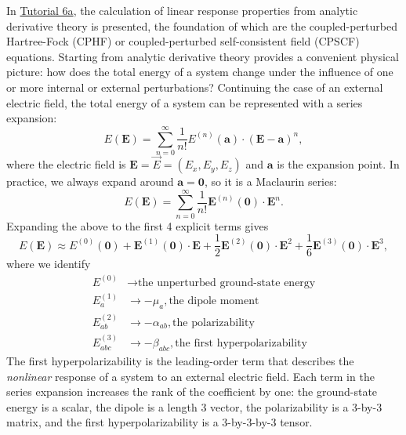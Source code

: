 In \href{https://github.com/psi4/psi4numpy/blob/066f378f26240a4802371ef32849230853581329/Tutorials/06_Molecular_Properties/6a_CP-SCF.ipynb}{Tutorial 6a}, the calculation of linear response properties from analytic derivative theory is presented, the foundation of which are the coupled-perturbed Hartree-Fock (CPHF) or coupled-perturbed self-consistent field (CPSCF) equations. Starting from analytic derivative theory provides a convenient physical picture: how does the total energy of a system change under the influence of one or more internal or external perturbations? Continuing the case of an external electric field, the total energy of a system can be represented with a series expansion:
\begin{equation}
  E(\mathbf{E}) = \sum_{n=0}^{\infty} \frac{1}{n!}E^{(n)}(\mathbf{a})\cdot(\mathbf{E}-\mathbf{a})^{n},
\end{equation}
where the electric field is \(\mathbf{E} = \vec{E} = (E_x,E_y,E_z)\) and \(\mathbf{a}\) is the expansion point. In practice, we always expand around \(\mathbf{a} = \mathbf{0}\), so it is a Maclaurin series:
\begin{equation}
  E(\mathbf{E}) = \sum_{n=0}^{\infty} \frac{1}{n!}\mathbf{E}^{(n)}(\mathbf{0})\cdot\mathbf{E}^{n}.
\end{equation}
Expanding the above to the first 4 explicit terms gives
\begin{equation}
  E(\mathbf{E}) \approx E^{(0)}(\mathbf{0}) + \mathbf{E}^{(1)}(\mathbf{0})\cdot\mathbf{E} + \frac{1}{2}\mathbf{E}^{(2)}(\mathbf{0})\cdot\mathbf{E}^{2} + \frac{1}{6}\mathbf{E}^{(3)}(\mathbf{0})\cdot\mathbf{E}^{3},
\end{equation}
where we identify
\begin{align}
E^{(0)} &\rightarrow \textrm{the unperturbed ground-state energy} \\
E_{a}^{(1)} &\rightarrow -\mu_{a},\textrm{the dipole moment} \\
E_{ab}^{(2)} &\rightarrow -\alpha_{ab},\textrm{the polarizability} \\
E_{abc}^{(3)} &\rightarrow -\beta_{abc},\textrm{the first hyperpolarizability}
\end{align}
The first hyperpolarizability is the leading-order term that describes the \emph{nonlinear} response of a system to an external electric field.  Each term in the series expansion increases the rank of the coefficient by one: the ground-state energy is a scalar, the dipole is a length 3 vector, the polarizability is a 3-by-3 matrix, and the first hyperpolarizability is a 3-by-3-by-3 tensor.

